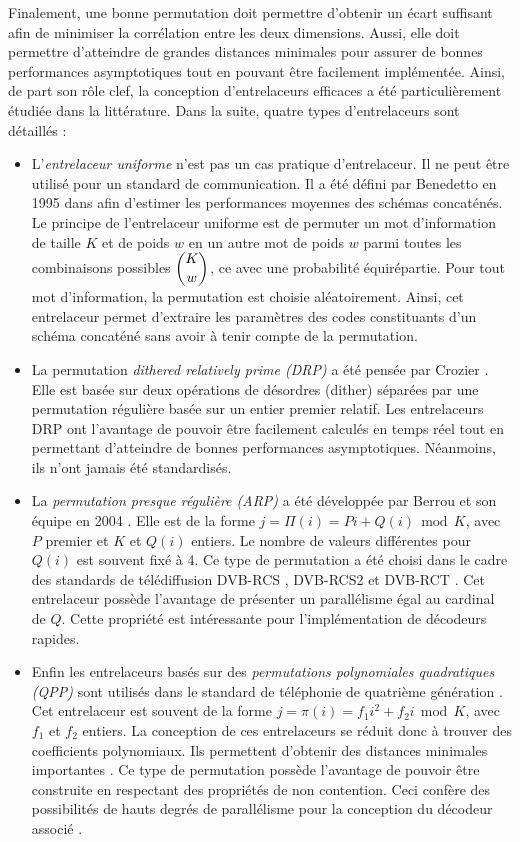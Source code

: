 Finalement, une bonne permutation doit permettre d'obtenir un écart suffisant afin de minimiser la corrélation entre les 
deux dimensions. Aussi, elle doit permettre d'atteindre de grandes distances minimales pour assurer de bonnes performances 
asymptotiques tout en pouvant être facilement implémentée. Ainsi, de part son rôle clef, la conception  d'entrelaceurs 
efficaces a été particulièrement étudiée dans la littérature. Dans la suite, quatre types d'entrelaceurs sont détaillés :
\begin{itemize}
	\item L'\emph{entrelaceur uniforme} n'est pas un cas pratique d'entrelaceur. Il ne peut être utilisé pour un standard 
	de communication. Il a été défini par Benedetto en 1995 dans \cite{benedettoAverage} afin d'estimer les performances 
	moyennes des schémas concaténés. Le principe de l'entrelaceur uniforme est de permuter un mot d'information de taille 
	$K$ et de poids $w$ en un autre mot de poids $w$ parmi toutes les combinaisons possibles $\dbinom{K}{w}$, ce avec une 
	probabilité équirépartie. Pour tout mot d'information, la permutation est choisie aléatoirement. Ainsi, cet entrelaceur 
	permet d'extraire les paramètres des codes constituants d'un schéma concaténé sans avoir à tenir compte de la permutation.
	\item La permutation \emph{dithered relatively prime (DRP)} a été pensée par Crozier \cite{crozierDRP}. Elle est basée 
	sur deux opérations de désordres (dither) séparées par une permutation régulière basée sur un entier premier relatif. 
	Les entrelaceurs DRP ont l'avantage de pouvoir être facilement calculés en temps réel tout en permettant d'atteindre 
	de bonnes performances asymptotiques. Néanmoins, ils n'ont jamais été standardisés.
	\item La \emph{permutation presque régulière (ARP)} a été développée par Berrou et son équipe en 2004 \cite{BerrouARP}. 
	Elle est de la forme $j=\Pi(i)=Pi+Q(i)~~\text{mod}~~K$, avec $P$ premier et $K$ et $Q(i)$ entiers. Le nombre de valeurs 
	différentes pour $Q(i)$ est souvent fixé à 4. Ce type de permutation a été choisi dans le cadre des standards de 
	télédiffusion 	DVB-RCS \cite{dvbrcs},  DVB-RCS2 \cite{dvbrcs2} et  DVB-RCT \cite{dvbrct}. Cet entrelaceur possède 
	l’avantage de présenter un parallélisme égal au cardinal de $Q$. Cette propriété est intéressante pour l'implémentation 
	de décodeurs rapides. 
	\item Enfin les entrelaceurs basés sur des \emph{permutations polynomiales quadratiques (QPP)} \cite{sunQPP} sont 
	utilisés dans le standard de téléphonie de quatrième génération \cite{lte}. Cet entrelaceur est souvent de la forme 
	$j=\pi(i)=f_1 i^2 + f_2 i~~\text{mod}~~K$, avec $f_1$ et $f_2$ entiers. La conception de ces entrelaceurs se réduit 
	donc à trouver des coefficients polynomiaux. Ils permettent d'obtenir des distances minimales importantes \cite{rosnesQPP}. 
	Ce type de permutation possède l'avantage de pouvoir être construite en respectant des propriétés de non contention. 
	Ceci confère des possibilités de hauts degrés de parallélisme pour la conception du décodeur associé \cite{takeshitaQPP}.  
\end{itemize}
